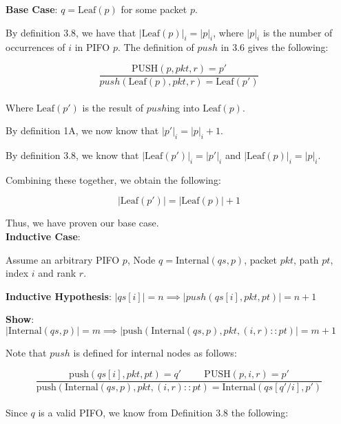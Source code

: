 \documentclass{article}
\begin{document}
\noindent \textbf{Base Case}: $q = \text{Leaf}(p)$ for some packet $p$.\newline

\noindent By definition 3.8, we have that $|\text{Leaf}(p)|_i = |p|_i$, where $|p|_i$ is the number of occurrences of $i$ in PIFO $p$. The definition of $push$ in 3.6 gives the following:

$$\frac{\text{PUSH}(p, pkt, r) = p'}{push(\text{Leaf}(p), pkt, r) = \text{Leaf}(p')}$$\\[-10pt]

\noindent Where $\text{Leaf}(p')$ is the result of $push$ing into $\text{Leaf}(p)$.\newline

\noindent By definition 1A, we now know that $|p'|_i = |p|_i + 1$.\newline

\noindent By definition 3.8, we know that $|\text{Leaf}(p')|_i = |p'|_i$ and $|\text{Leaf}(p)|_i = |p|_i$.\newline

\noindent Combining these together, we obtain the following:

$$|\text{Leaf}(p')| = |\text{Leaf}(p)| + 1$$

\noindent Thus, we have proven our base case.\\[10pt]

\noindent \textbf{Inductive Case}:\newline

\noindent Assume an arbitrary PIFO $p$, Node $q = \text{Internal}(qs, p)$, packet $pkt$, path $pt$, index $i$ and rank $r$.\newline

\noindent \textbf{Inductive Hypothesis}: $|qs[i]| = n \implies |push(qs[i], pkt, pt)| = n+1$\newline

\noindent \textbf{Show}: $|\text{Internal}(qs, p)| = m \implies |\text{push}(\text{Internal}(qs, p), pkt, (i, r) :: pt)| = m+1$\newline

\noindent Note that $push$ is defined for internal nodes as follows:

$$\frac{\text{push}(qs[i], pkt, pt) = q' \hspace{1cm} \text{PUSH}(p, i, r) = p'}{\text{push}(\text{Internal}(qs, p), pkt, (i, r) :: pt) = \text{Internal}(qs[q'/i], p')}$$\\[-10pt]

\noindent Since $q$ is a valid PIFO, we know from Definition 3.8 the following:
\end{document}
